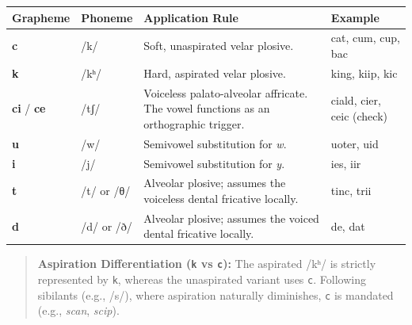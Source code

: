 {\def\LTcaptype{} %
\begin{longtable}[]{@{}
  >{\raggedright\arraybackslash}p{}
  >{\raggedright\arraybackslash}p{}
  >{\raggedright\arraybackslash}p{}
  >{\raggedright\arraybackslash}p{}@{}}
\toprule\noalign{}
\begin{minipage}[b]{\linewidth}\raggedright
Grapheme
\end{minipage} & \begin{minipage}[b]{\linewidth}\raggedright
Phoneme
\end{minipage} & \begin{minipage}[b]{\linewidth}\raggedright
Application Rule
\end{minipage} & \begin{minipage}[b]{\linewidth}\raggedright
Example
\end{minipage} \\
\midrule\noalign{}
\endhead
\bottomrule\noalign{}
\endlastfoot
\textbf{c} & /k/ & Soft, unaspirated velar plosive. & cat, cum, cup,
bac \\
\textbf{k} & /kʰ/ & Hard, aspirated velar plosive. & king, kiip, kic \\
\textbf{ci} / \textbf{ce} & /tʃ/ & Voiceless palato-alveolar affricate.
The vowel functions as an orthographic trigger. & ciald, cier, ceic
(check) \\
\textbf{u} & /w/ & Semivowel substitution for \emph{w}. & uoter, uid \\
\textbf{i} & /j/ & Semivowel substitution for \emph{y}. & ies, iir \\
\textbf{t} & /t/ or /θ/ & Alveolar plosive; assumes the voiceless dental
fricative locally. & tinc, trii \\
\textbf{d} & /d/ or /ð/ & Alveolar plosive; assumes the voiced dental
fricative locally. & de, dat \\
\end{longtable}
}

\begin{quote}
\textbf{Aspiration Differentiation (\texttt{k} vs \texttt{c}):} The
aspirated /kʰ/ is strictly represented by \texttt{k}, whereas the
unaspirated variant uses \texttt{c}. Following sibilants (e.g., /s/),
where aspiration naturally diminishes, \texttt{c} is mandated (e.g.,
\emph{scan}, \emph{scip}).
\end{quote}

